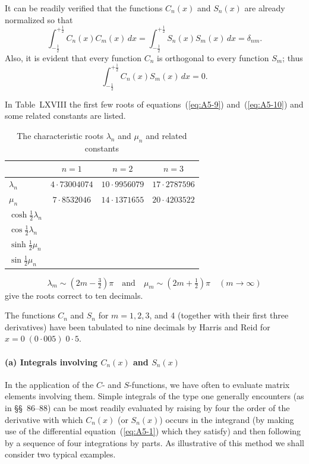 It can be readily verified that the functions $C_n(x)$ and $S_n(x)$ are
already normalized so that
\begin{equation}
\label{eq:A5-11}
\int_{-\frac{1}{2}}^{+\frac{1}{2}} C_n(x) C_m(x) \, dx = \int_{-\frac{1}{2}}^{+\frac{1}{2}} S_n(x) S_m(x) \, dx = \delta_{nm}.
\end{equation}
Also, it is evident that every function $C_n$ is orthogonal to every function $S_m$; thus
\begin{equation}
\label{eq:A5-12}
\int_{-\frac{1}{2}}^{+\frac{1}{2}} C_n(x) S_m(x) \, dx = 0.
\end{equation}

In Table~LXVIII the first few roots of equations~(\ref{eq:A5-9}) and~(\ref{eq:A5-10}) and
some related constants are listed.

\begin{table}[htbp]
\centering
\caption{The characteristic roots $\lambda_n$ and $\mu_n$ and related constants}
\label{tab:LXVIII}
\begin{tabular}{lccc}
\hline
 & $n=1$ & $n=2$ & $n=3$ \\
\hline
$\lambda_n$ & $4{\cdot}73004074$ & $10{\cdot}9956079$ & $17{\cdot}2787596$ \\
$\mu_n$ & $7{\cdot}8532046$ & $14{\cdot}1371655$ & $20{\cdot}4203522$ \\
$\cosh\frac{1}{2}\lambda_n$ & & & \\
$\cos\frac{1}{2}\lambda_n$ & & & \\
$\sinh\frac{1}{2}\mu_n$ & & & \\
$\sin\frac{1}{2}\mu_n$ & & & \\
\hline
\end{tabular}
\end{table}

\begin{equation}
\label{eq:A5-13}
\lambda_m \sim (2m - \tfrac{3}{2})\pi \quad \text{and} \quad \mu_m \sim (2m+\tfrac{1}{2})\pi \quad (m\to\infty)
\end{equation}
give the roots correct to ten decimals.

The functions $C_n$ and $S_n$ for $m = 1, 2, 3$, and 4 (together with their
first three derivatives) have been tabulated to nine decimals by Harris
and Reid for $x = 0\;(0{\cdot}005)\;0{\cdot}5$.

\paragraph{(a) Integrals involving $C_n(x)$ and $S_n(x)$}
In the application of the $C$- and $S$-functions, we have often to
evaluate matrix elements involving them. Simple integrals of the type
one generally encounters (as in \S\S~86--88) can be most readily evaluated
by raising by four the order of the derivative with which $C_n(x)$ (or
$S_n(x)$) occurs in the integrand (by making use of the differential equation~(\ref{eq:A5-1}) which they satisfy) and then following by a sequence of four integrations by parts. As illustrative of this method we shall consider two
typical examples.

